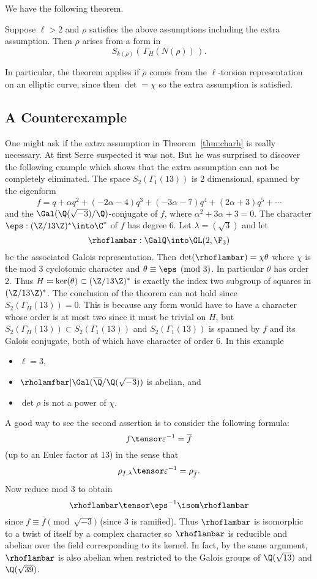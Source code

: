 \documentclass{report}
\begin{document}
We have the following theorem.
\begin{theorem}\label{thm:charh} Suppose $\ell>2$ and $\rho$ satisfies the above assumptions
including the extra assumption. Then $\rho$ arises from a form
in $$S_{k(\rho)}(\,\Gamma_H(N(\rho))\,).$$
\end{theorem}
In particular, the theorem applies if $\rho$ comes
from the $\ell$-torsion representation on an elliptic
curve, since then $\det=\chi$ so the extra assumption is satisfied.

\subsection{A Counterexample}
One might ask if the extra assumption in Theorem~\ref{thm:charh}
is really necessary. At first Serre suspected it was not.
But he was surprised to discover the following example
which shows that the extra assumption can not
be completely eliminated.
The space $S_2(\Gamma_1(13))$ is 2 dimensional, spanned by the eigenform
$$f = q + \alpha{}q^2 +
     (-2\alpha-4)q^3 + (-3\alpha-7)q^4 + (2\alpha+3)q^5 + \cdots$$
and the $\Gal(\Q(\sqrt{-3})/\Q)$-conjugate of $f$,
where $\alpha^2+3\alpha+3=0$.
The character $\eps:(\Z/13\Z)^*\into\C^*$
of $f$ has degree $6$.
Let $\lambda=(\sqrt{3})$ and let
      $$\rhoflambar:\GalQ\into\GL(2,\F_3)$$
be the associated Galois representation.
Then $\det(\rhoflambar)=\chi\theta$ where $\chi$ is the mod 3 cyclotomic
character and $\theta\equiv\eps\pmod{3}$.
In particular $\theta$ has order $2$.
Thus $H=\ker(\theta)\subset (\Z/13\Z)^*$ is exactly the
index two subgroup of squares in $(\Z/13\Z)^*$.
The conclusion of the theorem can not hold since $S_2(\Gamma_H(13))=0$.
This is because any form would have to have a character whose order is
at most two since it must be trivial on $H$, but
$S_2(\Gamma_H(13))\subset S_2(\Gamma_1(13))$ and
$S_2(\Gamma_1(13))$ is spanned by
$f$ and its Galois conjugate, both of which have
character of order $6$.
In this example
\begin{itemize}
\item $\ell=3$,
\item $\rholamfbar|\Gal(\overline{\Q}/\Q(\sqrt{-3}))$ is abelian, and
\item $\det\rho$ is not a power of $\chi$.
\end{itemize}

A good way to see the second assertion is to consider
the following formula:
$$f\tensor\varepsilon^{-1}=\overline{f}$$
(up to an Euler factor at 13)
in the sense that
  $$\rho_{f,\lambda}\tensor\varepsilon^{-1}=\rho_{\overline{f}}.$$
Now reduce mod $3$ to obtain
$$\rhoflambar\tensor\eps^{-1}\isom\rhoflambar$$
since $f\equiv\overline{f}\pmod{\sqrt{-3}}$ (since $3$ is ramified).
Thus $\rhoflambar$ is isomorphic to a twist of itself by
a complex character so $\rhoflambar$ is
reducible and abelian over the field
corresponding to its kernel.
In fact, by the same argument,
$\rhoflambar$ is also abelian when restricted to
the Galois groups of $\Q(\sqrt{13})$ and
$\Q(\sqrt{39})$.
\end{document}
